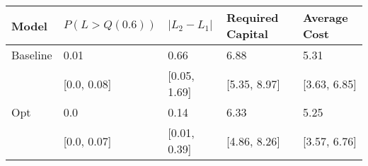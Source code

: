 \begin{tabular}{lllll}
\toprule
   Model & $P(L > Q(0.6))$ & $|L_2 - L_1|$ & Required Capital & Average Cost \\
\midrule
Baseline &            0.01 &          0.66 &             6.88 &         5.31 \\
         &     [0.0, 0.08] &  [0.05, 1.69] &     [5.35, 8.97] & [3.63, 6.85] \\
     Opt &             0.0 &          0.14 &             6.33 &         5.25 \\
         &     [0.0, 0.07] &  [0.01, 0.39] &     [4.86, 8.26] & [3.57, 6.76] \\
\bottomrule
\end{tabular}
